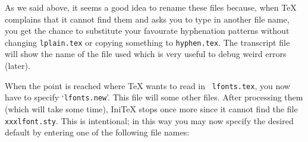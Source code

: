  As we said above,
 it seems a good idea to rename these files because, when \TeX{}
 complains that it cannot find them and asks you to type in another
 file name, you get the chance to substitute
 your favourate hyphenation patterns without changing {\tt lplain.tex}
 or copying something to {\tt hyphen.tex}.
 The transcript file
 will show the name of the file used which is very useful to debug
 weird errors (later).

 When the point is reached where \TeX{} wants to read in {\tt
 lfonts.tex}, you now have to specify `{\tt lfonts.new}'. This file
 will \verb++ some other files.  After processing them
 (which will take some time), Ini\TeX{} stops once more since it cannot
 find the file {\tt xxxlfont.sty}.  This is intentional; %
 in this way
 you may now specify the desired default by entering one of the following
 file names:
